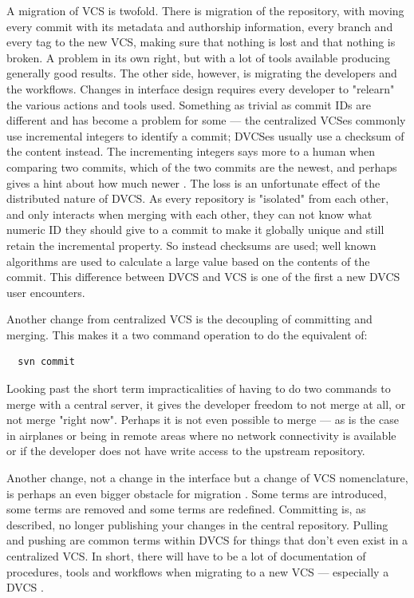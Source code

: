 \documentclass{llncs}
\begin{document}
A migration of VCS is twofold. There is migration of the repository,
with moving every commit with its metadata and authorship
information, every branch and every tag to the new VCS, making sure
that nothing is lost and that nothing is broken. A problem in its own
right, but with a lot of tools available producing generally good
results. The other side, however, is migrating the developers and the
workflows. Changes in interface design requires every developer to
"relearn" the various actions and tools used. Something as trivial as
commit IDs are different and has become a problem for some
 \cite{alwis09} --- the centralized VCSes commonly use incremental
integers to identify a commit; DVCSes usually use a checksum of the
content instead. The incrementing integers says more to a human when
comparing two commits, which of the two commits are the newest, and
perhaps gives a hint about how much newer \cite{bird09}. The loss is
an unfortunate effect of the distributed nature of DVCS. As every
repository is "isolated" from each other, and only interacts when
merging with each other, they can not know what numeric ID they should
give to a commit to make it globally unique and still retain the
incremental property.  So instead checksums are used; well known
algorithms are used to calculate a large value based on the contents
of the commit. This difference between DVCS and VCS is one of the
first a new DVCS user encounters.

Another change from centralized VCS is the decoupling of committing
and merging. This makes it a two command operation to do the
equivalent of:

\begin{verbatim}
  svn commit
\end{verbatim}

Looking past the short term impracticalities of having to do two
commands to merge with a central server, it gives the developer
freedom to not merge at all, or not merge "right now". Perhaps it is
not even possible to merge --- as is the case in airplanes or being in
remote areas where no network connectivity is available or if the
developer does not have write access to the upstream repository.

Another change, not a change in the interface but a change of VCS
nomenclature, is perhaps an even bigger obstacle for migration
\cite{bird09}. Some terms are introduced, some terms are removed and
some terms are redefined. Committing is, as described, no longer
publishing your changes in the central repository. Pulling and pushing
are common terms within DVCS for things that don't even exist in a
centralized VCS. In short, there will have to be a lot of
documentation of procedures, tools and workflows when migrating to a
new VCS --- especially a DVCS \cite{alwis09}.
\end{document}
